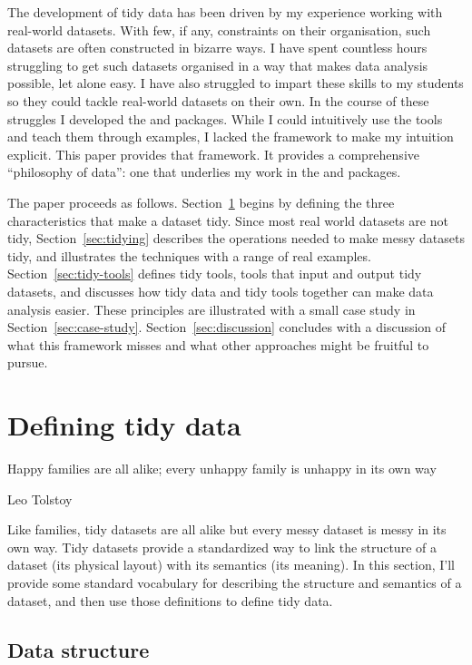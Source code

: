\documentclass[article]{jss}
\begin{document}
The development of tidy data has been driven by my experience working with real-world datasets. With few, if any, constraints on their organisation, such datasets are often constructed in bizarre ways. I have spent countless hours struggling to get such datasets organised in a way that makes data analysis possible, let alone easy. I have also struggled to impart these skills to my students so they could tackle real-world datasets on their own. In the course of these struggles I developed the  and  \citep{wickham:2007b} packages. While I could intuitively use the tools and teach them through examples, I lacked the framework to make my intuition explicit. This paper provides that framework. It provides a comprehensive ``philosophy of data'': one that underlies my work in the  \citep{me:plyr} and  \citep{me:ggplot2} packages.

The paper proceeds as follows. Section~\ref{sec:defining} begins by defining the three characteristics that make a dataset tidy. Since most real world datasets are not tidy, Section~\ref{sec:tidying} describes the operations needed to make messy datasets tidy, and illustrates the techniques with a range of real examples. Section~\ref{sec:tidy-tools} defines tidy tools, tools that input and output tidy datasets, and discusses how tidy data and tidy tools together can make data analysis easier. These principles are illustrated with a small case study in Section~\ref{sec:case-study}. Section~\ref{sec:discussion} concludes with a discussion of what this framework misses and what other approaches might be fruitful to pursue.

\section{Defining tidy data}
\label{sec:defining}

\epigraph{Happy families are all alike; every unhappy family is unhappy in its own way}{Leo Tolstoy}

Like families, tidy datasets are all alike but every messy dataset is messy in its own way. Tidy datasets provide a standardized way to link the structure of a dataset (its physical layout) with its semantics (its meaning). In this section, I'll provide some standard vocabulary for describing the structure and semantics of a dataset, and then use those definitions to define tidy data.

\subsection{Data structure}
\end{document}
